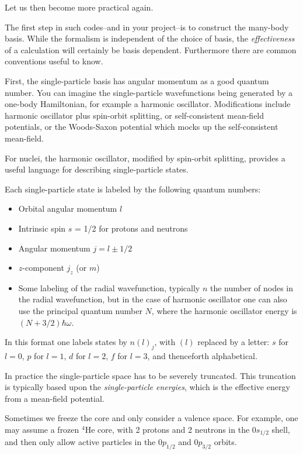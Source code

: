 Let us then become more practical again.

The first step in such codes--and in your project--is to construct the many-body basis.  
While the formalism is independent of the choice of basis, the \textit{effectiveness} of a calculation 
will certainly be basis dependent. 
Furthermore there are common conventions useful to know.

First, the single-particle basis has angular momentum as a good quantum number.  You can 
imagine the single-particle wavefunctions being generated by a one-body Hamiltonian, 
for example a harmonic oscillator.  Modifications include harmonic oscillator plus 
spin-orbit splitting, or self-consistent mean-field potentials, or the Woods-Saxon potential which mocks 
up the self-consistent mean-field. 

For nuclei, the harmonic oscillator, modified by spin-orbit splitting, provides a useful language 
for describing single-particle states.

Each single-particle state is labeled by the following quantum numbers: 
\begin{itemize}
\item Orbital angular momentum $l$

\item Intrinsic spin $s$ = 1/2 for protons and neutrons

\item Angular momentum $j = l \pm 1/2$

\item $z$-component $j_z$ (or $m$)

\item Some labeling of the radial wavefunction, typically $n$ the number of nodes in 
the radial wavefunction, but in the case of harmonic oscillator one can also use 
the principal quantum number $N$, where the harmonic oscillator energy is $(N+3/2)\hbar \omega$. 

\end{itemize}

In this format one labels states by $n(l)_j$, with $(l)$ replaced by a letter:
$s$ for $l=0$, $p$ for $l=1$, $d$ for $l=2$, $f$ for $l=3$, and thenceforth alphabetical.

 In practice the single-particle space has to be severely truncated.  This truncation is 
typically based upon the \textit{single-particle energies}, which is the effective energy 
from a mean-field potential. 

Sometimes we freeze the core and only consider a valence space. For example, one 
may assume a frozen $^{4}$He core, with 2 protons and 2 neutrons in the $0s_{1/2}$ 
shell, and then only allow active particles in the $0p_{1/2}$ and $0p_{3/2}$ orbits. 

